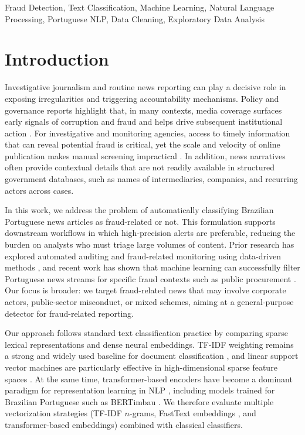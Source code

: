 \documentclass[conference]{IEEEtran}
\begin{document}
\begin{IEEEkeywords}
Fraud Detection, Text Classification, Machine Learning, Natural Language Processing, Portuguese NLP, Data Cleaning, Exploratory Data Analysis
\end{IEEEkeywords}

\section{Introduction}

Investigative journalism and routine news reporting can play a decisive role in exposing irregularities and triggering accountability mechanisms. Policy and governance reports highlight that, in many contexts, media coverage surfaces early signals of corruption and fraud and helps drive subsequent institutional action \cite{oecd2018media, unodc2014reporting}. For investigative and monitoring agencies, access to timely information that can reveal potential fraud is critical, yet the scale and velocity of online publication makes manual screening impractical \cite{kariuki2017monitoring}. In addition, news narratives often provide contextual details that are not readily available in structured government databases, such as names of intermediaries, companies, and recurring actors across cases.

In this work, we address the problem of automatically classifying Brazilian Portuguese news articles as fraud-related or not. This formulation supports downstream workflows in which high-precision alerts are preferable, reducing the burden on analysts who must triage large volumes of content. Prior research has explored automated auditing and fraud-related monitoring using data-driven methods \cite{santos2025mapping}, and recent work has shown that machine learning can successfully filter Portuguese news streams for specific fraud contexts such as public procurement \cite{assis2025classification}. Our focus is broader: we target fraud-related news that may involve corporate actors, public-sector misconduct, or mixed schemes, aiming at a general-purpose detector for fraud-related reporting.

Our approach follows standard text classification practice by comparing sparse lexical representations and dense neural embeddings. TF-IDF weighting remains a strong and widely used baseline for document classification \cite{salton1988term}, and linear support vector machines are particularly effective in high-dimensional sparse feature spaces \cite{cortes1995svm}. At the same time, transformer-based encoders have become a dominant paradigm for representation learning in NLP \cite{devlin2019bert}, including models trained for Brazilian Portuguese such as BERTimbau \cite{souza2020bertimbau}. We therefore evaluate multiple vectorization strategies (TF-IDF $n$-grams, FastText embeddings \cite{bojanowski2017enriching}, and transformer-based embeddings) combined with classical classifiers.
\end{document}
